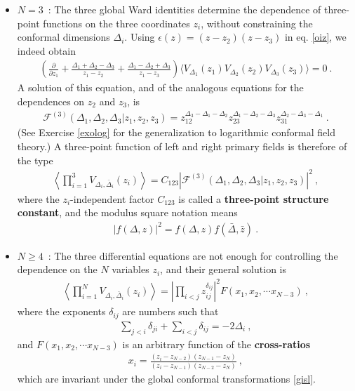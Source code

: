 \documentclass[12pt, a4paper, notitlepage, twoside]{report}
\numberwithin{equation}{section}
\theoremstyle{break}
\begin{document}
\begin{itemize}
\item $\boxed{N=3}$\ : The three global Ward identities determine the dependence of three-point functions on the three coordinates $z_i$, without constraining the conformal dimensions $\Delta_i$. Using $\epsilon(z)= (z-z_2)(z-z_3)$ in eq. \eqref{oiz}, we indeed obtain
\begin{align}
  \left(  \frac{\partial}{\partial z_1} + \frac{\Delta_1+\Delta_2-\Delta_3}{z_1-z_2} +\frac{\Delta_1-\Delta_2+\Delta_3}{z_1-z_3} \right) \Big\langle V_{\Delta_1}(z_1)V_{\Delta_2}(z_2)V_{\Delta_3}(z_3)\Big\rangle= 0\ .
\end{align}
A solution of this equation, and of the analogous equations for the dependences on $z_2$ and $z_3$, is 
\begin{align}
 \boxed{\mathcal{F}^{(3)}(\Delta_1,\Delta_2,\Delta_3|z_1,z_2,z_3) = z_{12}^{\Delta_3-\Delta_1-\Delta_2} z_{23}^{\Delta_1-\Delta_2-\Delta_3} z_{31}^{\Delta_2-\Delta_3-\Delta_1}}\ .
\label{fzzz}
\end{align}
(See Exercise \ref{exolog} for the generalization to logarithmic conformal field theory.)
A three-point function of left and right primary fields is therefore of the type
\begin{align}
 \boxed{ \left\langle \prod_{i=1}^3 V_{\Delta_i,\bar{\Delta}_i}(z_i) \right\rangle = C_{123}
 \left|\mathcal{F}^{(3)}(\Delta_1,\Delta_2,\Delta_3|z_1,z_2,z_3)\right|^2 }\ ,
\label{cff}
\end{align}
where the $z_i$-independent factor
$C_{123}$ is called a \textbf{\boldmath three-point structure constant}, and the modulus square notation means 
\begin{align}
|f(\Delta,z)|^2 = f(\Delta,z)f(\bar{\Delta},\bar{z})\ .
\label{eq:msn}
\end{align}

\item $\boxed{N\geq 4}$\ : The three differential equations are not enough for controlling the dependence on the $N$ variables $z_i$, and their general solution is 
\begin{align}
 \left\langle\prod_{i=1}^N V_{\Delta_i,\bar\Delta_i}(z_i)\right\rangle = \left|\prod_{i<j} z_{ij}^{\delta_{ij}}\right|^2 F(x_1,x_2,\cdots x_{N-3}) \ ,
\label{xfxn}
\end{align}
where the exponents $\delta_{ij}$ are numbers such that 
\begin{align}
 \sum_{j< i} \delta_{ji} +\sum_{i<j}\delta_{ij} = -2\Delta_i\ ,
 \label{sdd}
\end{align}
and $F(x_1,x_2,\cdots x_{N-3})$ is an arbitrary function of the \textbf{\boldmath cross-ratios}
\begin{align}
 x_i = \frac{(z_i-z_{N-2})(z_{N-1}-z_N)}{(z_i-z_{N-1})(z_{N-2}-z_N)}\ ,
\end{align}
which are invariant under the global conformal transformations \eqref{gisl}.


\end{itemize}
\end{document}
